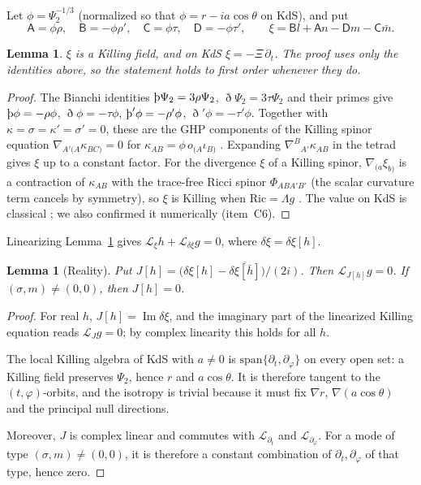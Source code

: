 \documentclass[11pt]{amsart}
\newtheorem{lemma}[theorem]{Lemma}
\theoremstyle{definition}
\theoremstyle{remark}
\numberwithin{equation}{section}
\newcommand{\Th}{\text{\th}}
\newcommand{\cL}{\mathcal{L}}
\renewcommand{\Im}{\operatorname{Im}}
\begin{document}
Let $\phi=\Psi_2^{-1/3}$ (normalized so that $\phi=r-ia\cos\theta$ on KdS), and put
\[
\mathsf A=\phi\rho,\quad \mathsf B=-\phi\rho',\quad \mathsf C=\phi\tau,\quad \mathsf D=-\phi\tau',\qquad \xi=\mathsf Bl+\mathsf An-\mathsf Dm-\mathsf C\bar m.
\]

\begin{lemma}\label{lem:xi}
$\xi$ is a Killing field, and on KdS $\xi=-\Xi\,\partial_t$. The proof uses only the identities above, so the
statement holds to first order whenever they do.
\end{lemma}
\begin{proof}
The Bianchi identities $\Th\Psi_2=3\rho\Psi_2$, $\eth\Psi_2=3\tau\Psi_2$ and their primes give $\Th\phi=-\rho\phi$,
$\eth\phi=-\tau\phi$, $\Th'\phi=-\rho'\phi$, $\eth'\phi=-\tau'\phi$. Together with $\kappa=\sigma=\kappa'=\sigma'=0$, these are
the GHP components of the Killing spinor equation $\nabla_{A'(A}\kappa_{BC)}=0$ for $\kappa_{AB}=\phi\,o_{(A}\iota_{B)}$
\cite{AA13}. Expanding $\nabla^B{}_{A'}\kappa_{AB}$ in the tetrad gives $\xi$ up to a constant factor. For the divergence $\xi$ of a
Killing spinor, $\nabla_{(a}\xi_{b)}$ is a contraction of $\kappa_{AB}$ with the trace-free Ricci spinor
$\Phi_{ABA'B'}$ (the scalar curvature term cancels by symmetry), so $\xi$ is Killing when $\mathrm{Ric}=\Lambda g$
\cite{HS73,AA13}. The value on KdS is classical \cite{HS73}; we also confirmed it numerically (item~C6).
\end{proof}

Linearizing Lemma~\ref{lem:xi} gives $\cL_\xi h+\cL_{\delta\xi}g=0$, where $\delta\xi=\delta\xi[h]$.

\begin{lemma}[Reality]\label{lem:reality}
Put $J[h]=\big(\delta\xi[h]-\overline{\delta\xi[\bar h]}\big)/(2i)$. Then $\cL_{J[h]}g=0$. If $(\sigma,m)\ne(0,0)$,
then $J[h]=0$.
\end{lemma}
\begin{proof}
For real $h$, $J[h]=\Im\delta\xi$, and the imaginary part of the linearized Killing equation reads $\cL_Jg=0$;
by complex linearity this holds for all $h$.

The local Killing algebra of KdS with $a\neq0$ is $\mathrm{span}\{\partial_t,\partial_\varphi\}$ on every open set:
a Killing field preserves $\Psi_2$, hence $r$ and $a\cos\theta$. It is therefore tangent to the $(t,\varphi)$-orbits,
and the isotropy is trivial because it must fix $\nabla r$, $\nabla(a\cos\theta)$ and the principal null directions.

Moreover, $J$ is complex linear and commutes with $\cL_{\partial_t}$ and $\cL_{\partial_\varphi}$. For a mode of type
$(\sigma,m)\ne(0,0)$, it is therefore a constant combination of $\partial_t,\partial_\varphi$ of that type, hence zero.
\end{proof}
\end{document}
